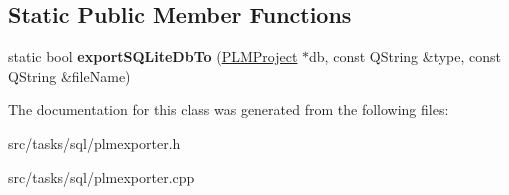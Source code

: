\subsection*{Static Public Member Functions}
\begin{DoxyCompactItemize}
\item 
static bool {\bfseries export\+S\+Q\+Lite\+Db\+To} (\hyperlink{class_p_l_m_project}{P\+L\+M\+Project} $\ast$db, const Q\+String \&type, const Q\+String \&file\+Name)\hypertarget{class_p_l_m_exporter_a69d82f803a8f20cd47ed4a0c80ad7f84}{}\label{class_p_l_m_exporter_a69d82f803a8f20cd47ed4a0c80ad7f84}

\end{DoxyCompactItemize}


The documentation for this class was generated from the following files\+:\begin{DoxyCompactItemize}
\item 
src/tasks/sql/plmexporter.\+h\item 
src/tasks/sql/plmexporter.\+cpp\end{DoxyCompactItemize}
